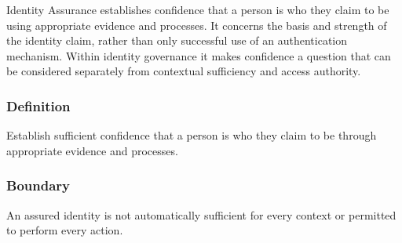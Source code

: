 Identity Assurance establishes confidence that a person is who they claim to be using appropriate evidence and processes. It concerns the basis and strength of the identity claim, rather than only successful use of an authentication mechanism. Within identity governance it makes confidence a question that can be considered separately from contextual sufficiency and access authority.

\subsubsection*{Definition}

Establish sufficient confidence that a person is who they claim to be through appropriate evidence and processes.

\subsubsection*{Boundary}

An assured identity is not automatically sufficient for every context or permitted to perform every action.

